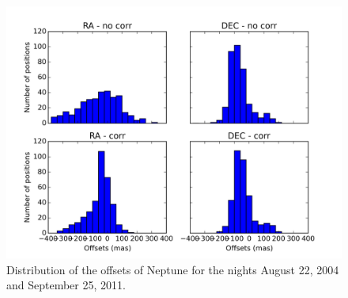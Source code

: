 \documentclass[12pt,a4paper]{report}
\begin{document}
\begin{figure}[h]
\includegraphics[width=16.0cm]{dist_Netuno_160.png} 
\caption{Distribution of the offsets of Neptune for the nights August 22, 2004 and September 25, 2011.}
\label{Fig:refraction-160}
\end{figure}
\end{document}
